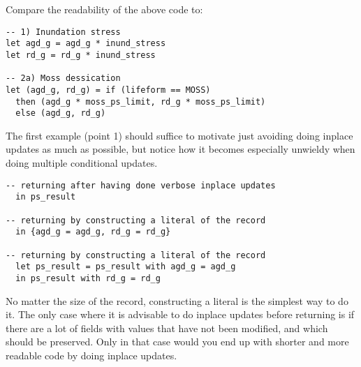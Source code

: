 Compare the readability of the above code to:

\begin{verbatim}
-- 1) Inundation stress
let agd_g = agd_g * inund_stress
let rd_g = rd_g * inund_stress

-- 2a) Moss dessication
let (agd_g, rd_g) = if (lifeform == MOSS)
  then (agd_g * moss_ps_limit, rd_g * moss_ps_limit)
  else (agd_g, rd_g)
\end{verbatim}

The first example (point 1) should suffice to motivate just avoiding doing inplace updates as much as possible, but notice how it becomes especially unwieldy when doing multiple conditional updates.

\begin{verbatim}
-- returning after having done verbose inplace updates
  in ps_result

-- returning by constructing a literal of the record
  in {agd_g = agd_g, rd_g = rd_g}

-- returning by constructing a literal of the record
  let ps_result = ps_result with agd_g = agd_g
  in ps_result with rd_g = rd_g
\end{verbatim}

No matter the size of the record, constructing a literal is the simplest way to do it. The only case where it is advisable to do inplace updates before returning is if there are a lot of fields with values that have not been modified, and which should be preserved. Only in that case would you end up with shorter and more readable code by doing inplace updates.


